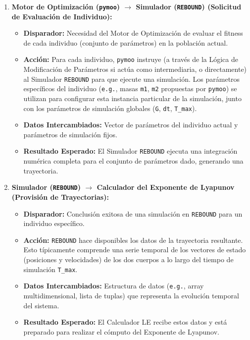 \begin{enumerate}
    \item \textbf{Motor de Optimización (\texttt{pymoo}) $\rightarrow$ Simulador (\texttt{REBOUND}) (Solicitud de Evaluación de Individuo):}
    \begin{itemize}
        \item \textbf{Disparador:} Necesidad del Motor de Optimización de evaluar el fitness de cada individuo (conjunto de parámetros) en la población actual.
        \item \textbf{Acción:} Para cada individuo, \texttt{pymoo} instruye (a través de la Lógica de Modificación de Parámetros si actúa como intermediaria, o directamente) al Simulador \texttt{REBOUND} para que ejecute una simulación. Los parámetros específicos del individuo (\texttt{e.g.}, masas \texttt{m1}, \texttt{m2} propuestas por \texttt{pymoo}) se utilizan para configurar esta instancia particular de la simulación, junto con los parámetros de simulación globales (\texttt{G}, \texttt{dt}, \texttt{T\_max}).
        \item \textbf{Datos Intercambiados:} Vector de parámetros del individuo actual y parámetros de simulación fijos.
        \item \textbf{Resultado Esperado:} El Simulador \texttt{REBOUND} ejecuta una integración numérica completa para el conjunto de parámetros dado, generando una trayectoria.
    \end{itemize}

    \item \textbf{Simulador (\texttt{REBOUND}) $\rightarrow$ Calculador del Exponente de Lyapunov (Provisión de Trayectorias):}
    \begin{itemize}
        \item \textbf{Disparador:} Conclusión exitosa de una simulación en \texttt{REBOUND} para un individuo específico.
        \item \textbf{Acción:} \texttt{REBOUND} hace disponibles los datos de la trayectoria resultante. Esto típicamente comprende una serie temporal de los vectores de estado (posiciones y velocidades) de los dos cuerpos a lo largo del tiempo de simulación \texttt{T\_max}.
        \item \textbf{Datos Intercambiados:} Estructura de datos (\texttt{e.g.}, array multidimensional, lista de tuplas) que representa la evolución temporal del sistema.
        \item \textbf{Resultado Esperado:} El Calculador LE recibe estos datos y está preparado para realizar el cómputo del Exponente de Lyapunov.
    \end{itemize}


\end{enumerate}
